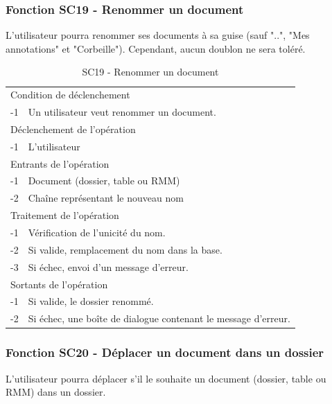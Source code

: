 \documentclass[a4paper]{article}
\begin{document}
\subsubsection{Fonction SC19 - Renommer un document}
L'utilisateur pourra renommer ses documents à sa guise (sauf "..", "Mes annotations" et "Corbeille"). Cependant, aucun doublon ne sera toléré.
 

\begin{table}[H]
  \centering
   \small
	\begin{tabular}{|c|p{12cm}|}
   		\hline
   			\rowcolor{lightgray}\multicolumn{2}{|c|}{\textbf{SC19 - Renommer un document}} \\
   		\hline
   			\multicolumn{2}{|l|}{Condition de d\'eclenchement} \\
   		\hline
   			-1 & Un utilisateur veut renommer un document.\\
   		\hline
   			\multicolumn{2}{|l|}{D\'eclenchement de l'op\'eration} \\
   		\hline
   			-1 & L'utilisateur  \\
   		\hline
   			\multicolumn{2}{|l|}{Entrants de l'op\'eration} \\
   		\hline
   			-1 & Document (dossier, table ou RMM)\\
        		-2 & Chaîne représentant le nouveau nom\\
   		\hline
   			\multicolumn{2}{|l|}{Traitement de l'op\'eration} \\
  		\hline
   			-1 & Vérification de l'unicité du nom. \\
			-2 & Si valide, remplacement du nom dans la base. \\
			-3 & Si échec, envoi d'un message d'erreur. \\
   		\hline
   			\multicolumn{2}{|l|}{Sortants de l'op\'eration} \\
   		\hline
   			-1 & Si valide, le dossier renommé. \\
			-2 & Si échec, une boîte de dialogue contenant le message d'erreur. \\
   		\hline
	\end{tabular}
  \caption{SC19 - Renommer un document}
  \normalsize
  \label{tab:renommer_document}
\end{table}

\subsubsection{Fonction SC20 - Déplacer un document dans un dossier}
L'utilisateur pourra déplacer s'il le souhaite un document (dossier, table ou RMM) dans un dossier.
\end{document}
